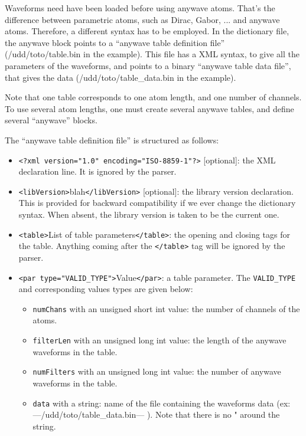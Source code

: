 \documentclass[11pt,a4paper]{article}
\begin{document}
Waveforms need have been loaded before using anywave atoms. That's the
difference between parametric atoms, such as Dirac, Gabor, ... and anywave
atoms. Therefore, a different syntax has to be employed. In the dictionary
file, the anywave block points to a ``anywave table definition file''
(/udd/toto/table.bin in the example). This file has a XML syntax, to give all
the parameters of the waveforms, and points to a binary ``anywave table data
file'', that gives the data (/udd/toto/table\_data.bin in the example).

Note that one table corresponds to one atom length, and one number of channels.
To use several atom lengths, one must create several anywave tables, and define
several ``anywave'' blocks.

The ``anywave table definition file'' is structured as follows:

\begin{itemize}
  
\item \verb+<?xml version="1.0" encoding="ISO-8859-1"?>+ [optional]: the XML
  declaration line. It is ignored by the parser.
  
\item \verb+<libVersion>+blah\verb+</libVersion>+ [optional]: the library
  version declaration. This is provided for backward compatibility if we ever
  change the dictionary syntax. When absent, the library version is taken to be
  the current one.
  
\item \verb+<table>+List of table parameters\verb+</table>+: the opening and
  closing tags for the table. Anything coming after the \verb+</table>+ tag
  will be ignored by the parser.
  
\item \verb+<par type="VALID_TYPE">+Value\verb+</par>+: a table parameter. The
  \verb+VALID_TYPE+ and corresponding values types are given below:
  \begin{itemize}
    
  \item \verb+numChans+ with an unsigned short int value: the number of
    channels of the atoms.
  \item \verb+filterLen+ with an unsigned long int value: the length of the
    anywave waveforms in the table.
  \item \verb+numFilters+ with an unsigned long int value: the number of
    anywave waveforms in the table.
  \item \verb+data+ with a string: name of the file containing the waveforms
    data (ex: ---/udd/toto/table\_data.bin--- ). Note that there is no {"}
    around the string.

  \end{itemize}
\end{itemize}
\end{document}
